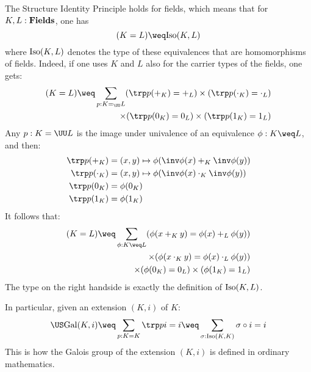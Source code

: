 \begin{remark}
  \label{rem:sip-univalence}
  The Structure Identity Principle holds for fields, which means that for
  $K,L:\mathbf{Fields}$, one has
  \begin{displaymath}
    (K = L) \weq \iso(K,L)
  \end{displaymath}
  where $\mathrm{Iso}(K,L)$ denotes the type of these equivalences that are
  homomorphisms of fields. Indeed, if one uses $K$ and $L$ also for the carrier
  types of the fields, one gets:
  \begin{displaymath}
    \begin{split}
      (K = L) \weq \sum_{p:K=_\UU L}  (\trp p (+_K) = +_L)
      \times (\trp p (\cdot_K) = \cdot_L)
      \\ \times (\trp p (0_K) = 0_L)
      \times (\trp p (1_K) = 1_L) 
    \end{split}
  \end{displaymath}
  Any $p : K =\UU L$ is the image under univalence of an equivalence $\phi: K \weq L$, and then:
  \begin{align*}
    \trp p (+_K) &= (x,y) \mapsto \phi( \inv\phi(x) +_K \inv \phi(y)) \\
    \trp p (\cdot_K) &= (x,y) \mapsto \phi( \inv\phi(x) \cdot_K \inv \phi(y)) \\
    \trp p (0_K) &=\phi( 0_K ) \\
    \trp p (1_K) &=\phi( 1_K )
  \end{align*}
  It follows that:
  \begin{displaymath}
    \begin{split}
      (K=L) \weq \sum_{\phi: K \weq L} (\phi(x +_K y) = \phi (x) +_L \phi (y)) \\
      \times (\phi(x\cdot_K y) = \phi (x) \cdot_L \phi (y)) \\
      \times (\phi(0_K) = 0_L)
        \times (\phi(1_K) = 1_L)
    \end{split}
  \end{displaymath}
  The type on the right handside is exactly the definition of $\mathrm{Iso}(K,L)$.

  In particular, given an extension $(K,i)$ of $K$:
  \begin{align*}
    \US \Gal(K,i) \weq \sum_{p:K=K} \trp p i = i \weq \sum_{\sigma:\iso(K,K)} \sigma \circ i = i
  \end{align*}
  This is how the Galois group of the extension $(K,i)$ is defined in ordinary mathematics.
\end{remark}


